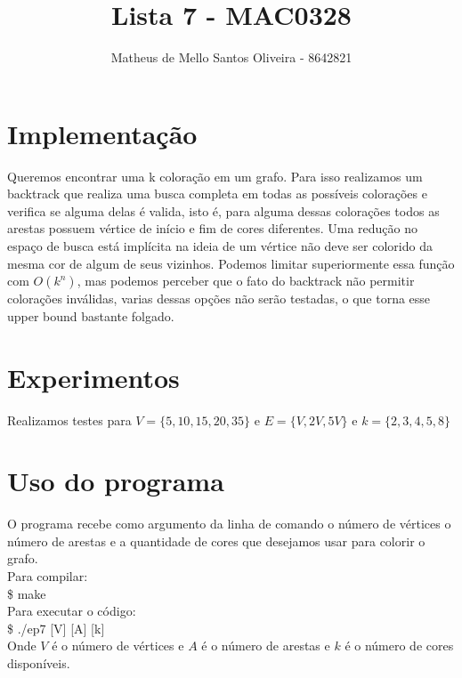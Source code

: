 \documentclass[a4paper]{article}
\title{Lista 7 - MAC0328} %
\author{Matheus de Mello Santos Oliveira - 8642821} %
\date{} %
\theoremstyle{style}
\theoremstyle{proof}
\begin{document}
\maketitle %


\section{Implementação}
Queremos encontrar uma k coloração em um grafo. Para isso realizamos um
backtrack que realiza uma busca completa em todas as possíveis colorações
e verifica se alguma delas é valida, isto é, para alguma dessas colorações
todos as arestas possuem vértice de início e fim de cores diferentes.
Uma redução no espaço de busca está implícita na ideia de um vértice não 
deve ser colorido da mesma cor de algum de seus vizinhos. Podemos limitar
superiormente essa função com $O(k^n)$, mas podemos perceber que o fato do
backtrack não permitir colorações inválidas, varias dessas opções não serão
testadas, o que torna esse upper bound bastante folgado.
\section{Experimentos}
Realizamos testes para $V = \{5, 10, 15, 20, 35\}$ e $E = \{V, 2V, 5V\}$ e 
$k = \{2, 3, 4, 5, 8\}$
\section{Uso do programa}
O programa recebe como argumento da linha de comando o número de vértices
o número de arestas e a quantidade de cores que desejamos usar para 
colorir o grafo.
\\Para compilar:
\\\$ make
\\Para executar o código:
\\\$ ./ep7 [V] [A] [k]
\\Onde $V$ é o número de vértices e $A$ é o número de arestas e $k$ é o 
número de cores disponíveis.
\end{document}
